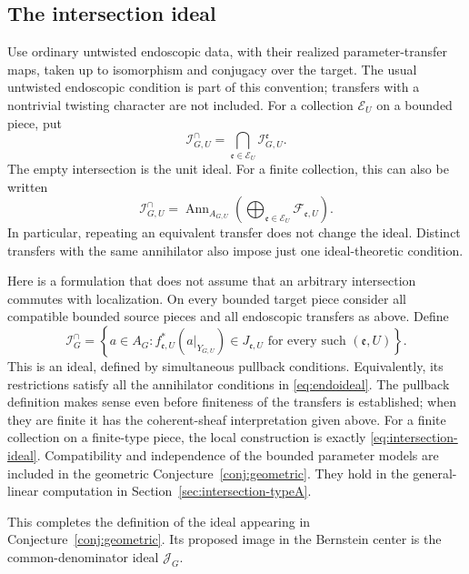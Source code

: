 \documentclass[11pt,a4paper]{amsart}
\DeclareMathOperator{\Ann}{Ann}
\newcommand{\mcJ}{\mathcal J}
\newcommand{\mcI}{\mathcal I}
\theoremstyle{definition}
\theoremstyle{remark}
\newcommand{\Icap}{\mathcal I^{\cap}}
\begin{document}
\subsection{The intersection ideal}
Use ordinary untwisted endoscopic data, with their realized
parameter-transfer maps, taken up to isomorphism and conjugacy over
the target. The usual untwisted endoscopic condition is part of this
convention; transfers with a nontrivial twisting character are not
included. For a collection $\mathcal E_U$ on a bounded piece, put
\begin{equation}\label{eq:intersection-ideal}
 {\Icap_{G,U}
   =\bigcap_{\mathfrak e\in\mathcal E_U}\mcI_{G,U}^{\mathfrak e}.}
\end{equation}
The empty intersection is the unit ideal. For a finite collection,
this can also be written
$$
 \Icap_{G,U}
 =\Ann_{A_{G,U}}\left(
       \bigoplus_{\mathfrak e\in\mathcal E_U}
                  \mathcal F_{\mathfrak e,U}\right).
$$
In particular, repeating an equivalent transfer does not change the
ideal. Distinct transfers with the same annihilator also impose just
one ideal-theoretic condition.

Here is a formulation that does not assume that an arbitrary
intersection commutes with localization.
On every bounded target piece consider all compatible bounded source
pieces and all endoscopic transfers as above. Define
\begin{equation}\label{eq:global-intersection}
 \Icap_G=\left\{a\in A_G:
 f_{\mathfrak e,U}^*(a|_{Y_{G,U}})\in J_{\mathfrak e,U}
 \text{ for every such }(\mathfrak e,U)\right\}.
\end{equation}
This is an ideal, defined by simultaneous pullback conditions.
Equivalently, its restrictions satisfy all the annihilator conditions
in \eqref{eq:endoideal}. The pullback definition makes sense even
before finiteness of the transfers is established; when they are
finite it has the coherent-sheaf interpretation given above.
For a finite collection on a finite-type piece, the local construction
is exactly \eqref{eq:intersection-ideal}. Compatibility and independence
of the bounded parameter models are included in the geometric
Conjecture~\ref{conj:geometric}. They hold in the general-linear computation in
Section~\ref{sec:intersection-typeA}.

This completes the definition of the ideal appearing in
Conjecture~\ref{conj:geometric}. Its proposed image in the Bernstein
center is the common-denominator ideal $\mcJ_G$.
\end{document}
